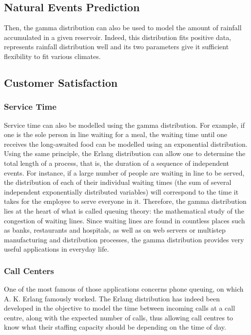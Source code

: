 \documentclass[12pt]{article}
\begin{document}
\subsection{Natural Events Prediction}
Then, the gamma distribution can also be used to model the amount of rainfall accumulated in a given reservoir. Indeed,
this distribution fits positive data, represents rainfall distribution well and its two parameters
give it sufficient flexibility to fit various climates\cite{husakUseGammaDistribution2007}.

\subsection{Customer Satisfaction}
\subsubsection{Service Time}
Service time can also be modelled using the gamma distribution. For example, if one is the sole person in line waiting for a meal, the
waiting time until one receives the long-awaited food can be modelled using an exponential distribution. Using the same
principle, the Erlang distribution can allow one to determine the total length of a process, that is, the duration of a
sequence of independent events. For instance, if a large number of people are waiting in line to be served, the
distribution of each of their individual waiting times (the sum of several independent exponentially distributed
variables) will correspond to the time it takes for the employee to serve everyone in it. Therefore, the gamma
distribution lies at the heart of what is called queuing theory: the mathematical study of the congestion of waiting
lines. Since waiting lines are found in countless places such as banks, restaurants and hospitals, as well as on web
servers or multistep manufacturing and distribution processes, the gamma distribution provides very useful applications
in everyday life.

\subsubsection{Call Centers}
One of the most famous of those applications concerns phone queuing, on which A. K. Erlang famously worked. The Erlang
distribution has indeed been developed in the objective to model the time between incoming calls at a call centre, along
with the expected number of calls, thus allowing call centres to know what their staffing capacity should be depending
on the time of day.
\end{document}
